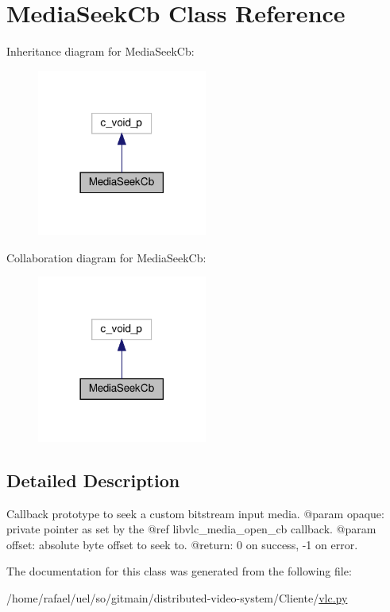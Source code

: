 \hypertarget{classvlc_1_1_media_seek_cb}{}\section{Media\+Seek\+Cb Class Reference}
\label{classvlc_1_1_media_seek_cb}


Inheritance diagram for Media\+Seek\+Cb\+:
\nopagebreak
\begin{figure}[H]
\begin{center}
\leavevmode
\includegraphics[width=158pt]{classvlc_1_1_media_seek_cb__inherit__graph}
\end{center}
\end{figure}


Collaboration diagram for Media\+Seek\+Cb\+:
\nopagebreak
\begin{figure}[H]
\begin{center}
\leavevmode
\includegraphics[width=158pt]{classvlc_1_1_media_seek_cb__coll__graph}
\end{center}
\end{figure}


\subsection{Detailed Description}
\begin{DoxyVerb}Callback prototype to seek a custom bitstream input media.
@param opaque: private pointer as set by the @ref libvlc_media_open_cb callback.
@param offset: absolute byte offset to seek to.
@return: 0 on success, -1 on error.
\end{DoxyVerb}
 

The documentation for this class was generated from the following file\+:\begin{DoxyCompactItemize}
\item 
/home/rafael/uel/so/gitmain/distributed-\/video-\/system/\+Cliente/\hyperlink{vlc_8py}{vlc.\+py}\end{DoxyCompactItemize}
